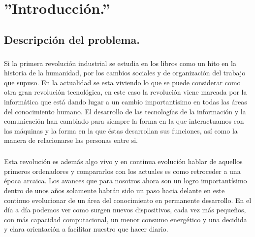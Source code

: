 \documentclass[a4paper,12pt,titlepage,final]{book}
\begin{document}
\chapter{''Introducción.''}

\section{Descripción del problema.}
\subsection*{}
\subsubsection*{}

\paragraph{}
Si la primera revolución industrial se estudia en los libros como un hito en la historia de la humanidad, por los cambios sociales y de organización del trabajo que supuso. En la actualidad se esta viviendo lo que se puede considerar como otra gran revolución tecnológica, en este caso la revolución viene marcada por la informática que está dando lugar a un cambio importantísimo en todas las áreas del conocimiento humano. El desarrollo de las tecnologías de la información y la comunicación han cambiado para siempre la forma en la que interactuamos con las máquinas y la forma en la que éstas desarrollan sus funciones, así como la manera de relacionarse las personas entre si.

\paragraph{}
Esta revolución es además algo vivo y en continua evolución hablar de aquellos primeros ordenadores y compararlos con los actuales es como retroceder a una época arcaica. Los avances que para nosotros ahora son un logro importantísimo dentro de unos años solamente habrán sido un paso hacia delante en este continuo evolucionar de un área del conocimiento en permanente desarrollo. En el día a día podemos ver como surgen nuevos dispositivos, cada vez más pequeños, con más capacidad computacional, un menor consumo energético y una decidida y clara orientación a facilitar nuestro que hacer diario.
\end{document}
